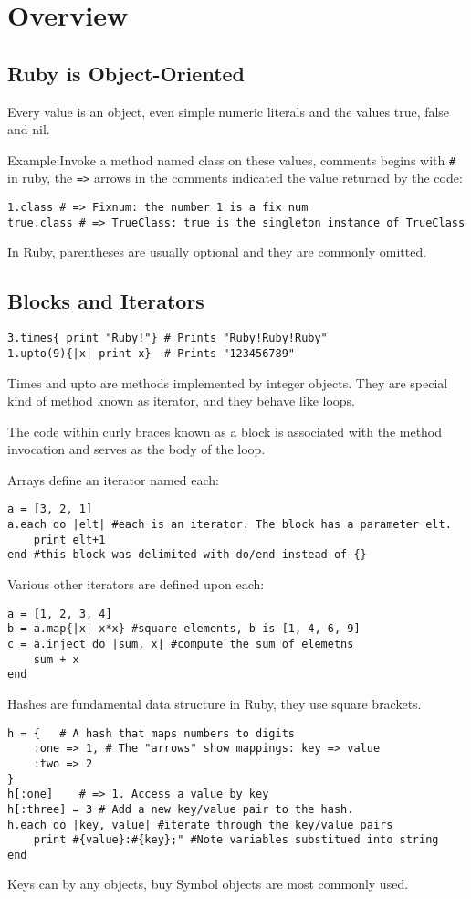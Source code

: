 \documentclass[11pt, a4paper]{book}
\begin{document}
\chapter{Overview}
\section{Ruby is Object-Oriented}
Every value is an object, even simple numeric literals and the values true,
false and nil.

Example:Invoke a method named class on these values, comments begins with
\verb|#| in ruby, the \verb|=>| arrows in the comments indicated the value
returned by the code:
\begin{verbatim}
1.class # => Fixnum: the number 1 is a fix num
true.class # => TrueClass: true is the singleton instance of TrueClass
\end{verbatim}
In Ruby, parentheses are usually optional and they are commonly omitted.
\section{Blocks and Iterators}
\begin{verbatim}
3.times{ print "Ruby!"} # Prints "Ruby!Ruby!Ruby"
1.upto(9){|x| print x}  # Prints "123456789"
\end{verbatim}
Times and upto are methods implemented by integer objects. They are special kind
of method known as iterator, and they behave like loops.

The code within curly braces known as a block is associated with the method
invocation and serves as the body of the loop.

Arrays define an iterator named each:
\begin{verbatim}
a = [3, 2, 1]
a.each do |elt| #each is an iterator. The block has a parameter elt.
    print elt+1
end #this block was delimited with do/end instead of {}
\end{verbatim}

Various other iterators are defined upon each:
\begin{verbatim}
a = [1, 2, 3, 4]
b = a.map{|x| x*x} #square elements, b is [1, 4, 6, 9]
c = a.inject do |sum, x| #compute the sum of elemetns
    sum + x
end
\end{verbatim}
Hashes are fundamental data structure in Ruby, they use square brackets.
\begin{verbatim}
h = {   # A hash that maps numbers to digits
    :one => 1, # The "arrows" show mappings: key => value
    :two => 2
}
h[:one]    # => 1. Access a value by key
h[:three] = 3 # Add a new key/value pair to the hash.
h.each do |key, value| #iterate through the key/value pairs
    print #{value}:#{key};" #Note variables substitued into string
end
\end{verbatim}
Keys can by any objects, buy Symbol objects are most commonly used.
\end{document}
